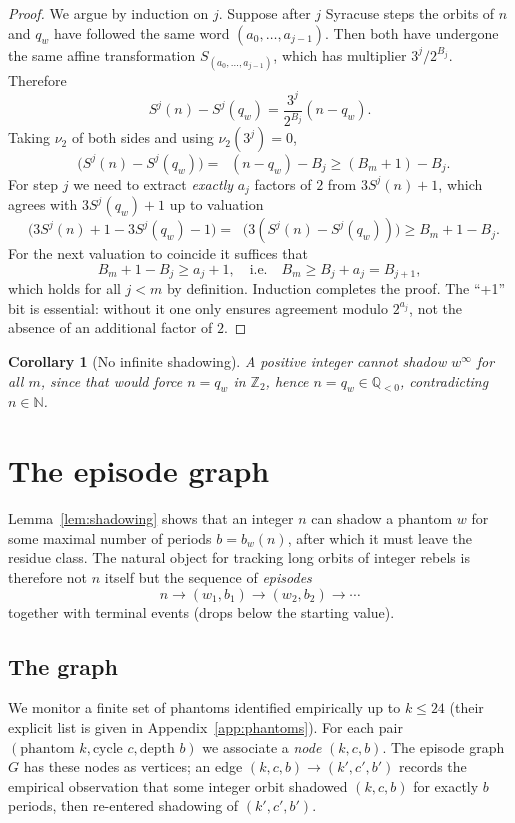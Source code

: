 \documentclass[11pt,a4paper]{article}
\newtheorem{corollary}[theorem]{Corollary}
\theoremstyle{definition}
\DeclareMathOperator{\nutwo}{\nu_2}
\newcommand{\Zp}{\mathbb{Z}_2}
\newcommand{\Q}{\mathbb{Q}}
\newcommand{\N}{\mathbb{N}}
\begin{document}
\begin{proof}
We argue by induction on $j$. Suppose after $j$ Syracuse steps the
orbits of $n$ and $q_w$ have followed the same word
$(a_0,\ldots,a_{j-1})$. Then both have undergone the same affine
transformation $S_{(a_0,\ldots,a_{j-1})}$, which has multiplier
$3^j / 2^{B_j}$. Therefore
\[
S^j(n) - S^j(q_w) = \frac{3^j}{2^{B_j}} (n - q_w).
\]
Taking $\nu_2$ of both sides and using $\nu_2(3^j)=0$,
\[
\nutwo\bigl(S^j(n) - S^j(q_w)\bigr)
= \nutwo(n - q_w) - B_j
\ge (B_m + 1) - B_j.
\]
For step $j$ we need to extract \emph{exactly} $a_j$ factors of $2$
from $3 S^j(n) + 1$, which agrees with $3 S^j(q_w) + 1$ up to
valuation
\[
\nutwo\bigl(3 S^j(n) + 1 - 3 S^j(q_w) - 1\bigr)
= \nutwo\bigl(3(S^j(n) - S^j(q_w))\bigr)
\ge B_m + 1 - B_j.
\]
For the next valuation to coincide it suffices that
\[
B_m + 1 - B_j \ge a_j + 1,
\quad\text{i.e.}\quad
B_m \ge B_j + a_j = B_{j+1},
\]
which holds for all $j < m$ by definition. Induction completes the
proof. The ``+1'' bit is essential: without it one only ensures
agreement modulo $2^{a_j}$, not the absence of an additional factor
of $2$.
\end{proof}

\begin{corollary}[No infinite shadowing]\label{cor:no-infinite}
A positive integer cannot shadow $w^\infty$ for all $m$, since that
would force $n = q_w$ in $\Zp$, hence $n = q_w \in \Q_{<0}$,
contradicting $n \in \N$.
\end{corollary}

\section{The episode graph}
\label{sec:episodes}

Lemma~\ref{lem:shadowing} shows that an integer $n$ can shadow a
phantom $w$ for some maximal number of periods $b = b_w(n)$, after
which it must leave the residue class. The natural object for
tracking long orbits of integer rebels is therefore not $n$ itself
but the sequence of \emph{episodes}
\[
n \to (w_1, b_1) \to (w_2, b_2) \to \cdots
\]
together with terminal events (drops below the starting value).

\subsection{The graph}

We monitor a finite set of phantoms identified empirically up to
$k\le 24$ (their explicit list is given in
Appendix~\ref{app:phantoms}). For each pair
$(\text{phantom }k, \text{cycle }c, \text{depth }b)$ we associate a
\emph{node} $(k,c,b)$. The episode graph $G$ has these nodes as
vertices; an edge $(k,c,b) \to (k',c',b')$ records the empirical
observation that some integer orbit shadowed $(k,c,b)$ for exactly
$b$ periods, then re-entered shadowing of $(k',c',b')$.
\end{document}
